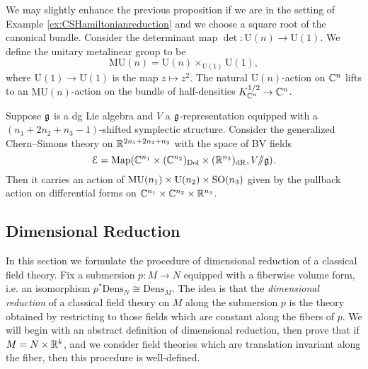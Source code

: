 \documentclass[10pt, oneside]{article}
\newcommand{\Dens}{\mathrm{Dens}}
\newcommand{\MU}{\mathrm{MU}}
\renewcommand{\U}{\mathrm{U}}
\newcommand{\ham}{/\!\!/}
\begin{document}
We may slightly enhance the previous proposition if we are in the setting of Example \ref{ex:CSHamiltonianreduction} and we choose a square root of the canonical bundle. Consider the determinant map $\det\colon \U(n)\rightarrow \U(1)$. We define the unitary metalinear group to be
\[\MU(n) = \U(n)\times_{\U(1)} \U(1),\]
where $\U(1)\rightarrow \U(1)$ is the map $z\mapsto z^2$. The natural $\U(n)$-action on $\mathbb C^n$ lifts to an $\MU(n)$-action on the bundle of half-densities $K_{\mathbb C^n}^{1/2}\rightarrow \mathbb C^n$.

\begin{prop}
Suppose $\mathfrak g$ is a dg Lie algebra and $V$ a $\mathfrak g$-representation equipped with a $(n_1+2n_2+n_3-1)$-shifted symplectic structure. Consider the generalized Chern--Simons theory on $\mathbb R^{2n_1+2n_2+n_3}$ with the space of BV fields
\[\cE = \map(\CC^{n_1}\times (\CC^{n_2})_{\mr{Dol}}\times (\RR^{n_3})_{\mr{dR}}, V\ham\fg).\]
Then it carries an action of $\MU(n_1)\times \U(n_2)\times \SO(n_3)$ given by the pullback action on differential forms on $\mathbb C^{n_1}\times \mathbb C^{n_2}\times \mathbb R^{n_3}$.
\end{prop}

\subsection{Dimensional Reduction} \label{dim_red_section}

In this section we formulate the procedure of dimensional reduction of a classical field theory. Fix a submersion $p\colon M\rightarrow N$ equipped with a fiberwise volume form, i.e. an isomorphism $p^*\Dens_N\cong \Dens_M$.  The idea is that the \emph{dimensional reduction} of a classical field theory on $M$ along the submersion $p$ is the theory obtained by restricting to those fields which are constant along the fibers of $p$.  We will begin with an abstract definition of dimensional reduction, then prove that if $M = N \times \mathbb R^k$, and we consider field theories which are translation invariant along the fiber, then this procedure is well-defined.
\end{document}

